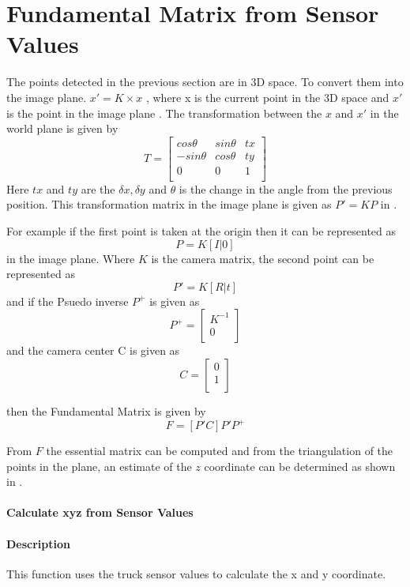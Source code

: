\section{Fundamental Matrix from Sensor Values}
	The points detected in the previous section are in 3D space. To convert them into the image plane.
	\( x'=K \times x \) , where x is the current point in the 3D space and $x'$ is the point in the image plane . The transformation between the $x$ and $x'$ in the world plane is given by 
	\[
  T=
  \left[ {\begin{array}{ccc}
   cos \theta & sin \theta & tx\\
   -sin \theta & cos \theta & ty \\
   0 & 0 & 1 \\
  \end{array} } \right]
\]
Here $tx$ and $ty$ are the \( \delta x , \delta y \) and \(\theta\) is the change in the angle from the previous position. This transformation matrix in the image plane is given as \( P'=K P \) in \cite{hartley2003multiple}.

 For example if the first point is taken at the origin then it can be represented as \[ P =K[I | 0] \] in the image plane. Where $K$ is the camera matrix, the second point can be represented as \[ P' =K [R | t] \] and if the Psuedo inverse \({P}^+\) is given as 
\[
  {P}^+=
  \left[ {\begin{array}{c}
   {K}^{-1} \\
   0  \\
   \end{array} } \right]
\] 
and the camera center C is given as 
\[
  C=
  \left[ {\begin{array}{c}
   0\\
   1\\
   \end{array} } \right]
\]

then the Fundamental Matrix is given by 
\[F = [P'C]P'P^{+}\]

 From $F$ the essential matrix can be computed and from the triangulation of the points in the plane, an estimate of the $z$ coordinate can be determined as shown in \cite{hartley2003multiple}.

\paragraph{ Calculate xyz from  Sensor Values}
\paragraph{Description}
This function uses the truck sensor values to calculate the x and y coordinate.
